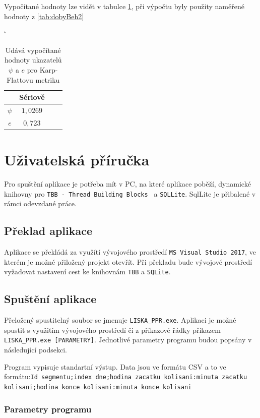 \documentclass{article}
\begin{document}
	Vypočítané hodnoty lze vidět v tabulce \ref{tab:karpik}, při výpočtu byly použity naměřené hodnoty z \ref{tab:dobyBeh2}
	
	\begin{table}[h]
	\centering
	\catcode`
	\def\arraystretch{1.2}
	\begin{tabular}{|c|c|c|c|}
	\hline
	\textbf{}   & \textbf{Sériově} \\ \hline
	\hline
	$\psi$    		  & $1,0269$\\ \hline
	$e$                  &  $0,723$\\ \hline
	\end{tabular}
	\caption{Udává vypočítané hodnoty ukazatelů $\psi$ a $e$ pro Karp-Flattovu metriku}
	\label{tab:karpik}
	\end{table}
	

	\section{Uživatelská příručka}
	Pro spuštění aplikace je potřeba mít v PC, na které aplikace poběží, dynamické knihovny pro \texttt{TBB - Thread Building Blocks } a \texttt{SQLLite}. SqlLite je přibalené v rámci odevzdané práce.
	\subsection{Překlad aplikace}
	Aplikace se překládá za využítí vývojového prostředí \texttt{MS Visual Studio 2017}, ve kterém je možné přiložený projekt otevřít. Při překladu bude vývojové prostředí vyžadovat nastavení cest ke knihovnám \texttt{TBB} a \texttt{SQLite}.
	\subsection{Spuštění aplikace}
	Přeložený spustitelný soubor se jmenuje \texttt{LISKA\_PPR.exe}. Aplikaci je možné spustit s využitím vývojového prostředí či z příkazové řádky příkazem \texttt{LISKA\_PPR.exe [PARAMETRY]}. Jednotlivé parametry programu budou popsány v následující podsekci.
	
	Program vypisuje standartní výstup. Data jsou ve formátu CSV a to ve formátu:\newline \texttt{Id segmentu;index dne;hodina zacatku kolisani:minuta zacatku kolisani;\newline hodina konce kolisani:minuta konce kolisani}
	\subsubsection{Parametry programu}
	
\end{document}
